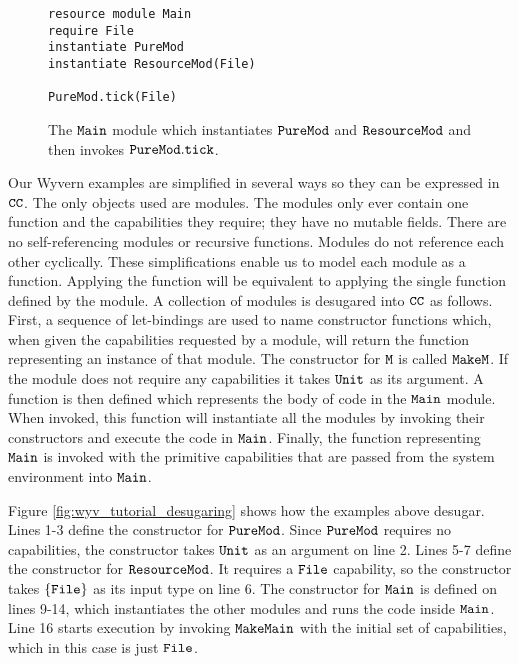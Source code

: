 \begin{figure}[h]

\begin{lstlisting}
resource module Main
require File
instantiate PureMod
instantiate ResourceMod(File)

PureMod.tick(File)
\end{lstlisting}

\caption{The $\mathtt{Main}$ module which instantiates $\mathtt{PureMod}$ and $\mathtt{ResourceMod}$ and then invokes $\mathtt{PureMod.tick}$.}
\label{fig:wyv_module_instantiation}
\end{figure}

Our Wyvern examples are simplified in several ways so they can be expressed in $\mathtt{CC}$. The only objects used are modules. The modules only ever contain one function and the capabilities they require; they have no mutable fields. There are no self-referencing modules or recursive functions. Modules do not reference each other cyclically. These simplifications enable us to model each module as a function. Applying the function will be equivalent to applying the single function defined by the module. A collection of modules is desugared into $\mathtt{CC}$ as follows. First, a sequence of let-bindings are used to name constructor functions which, when given the capabilities requested by a module, will return the function representing an instance of that module. The constructor for $\mathtt{M}$ is called $\mathtt{MakeM}$. If the module does not require any capabilities it takes $\mathtt{Unit}$ as its argument. A function is then defined which represents the body of code in the $\mathtt{Main}$ module. When invoked, this function will instantiate all the modules by invoking their constructors and execute the code in $\mathtt{Main}$. Finally, the function representing $\mathtt{Main}$ is invoked with the primitive capabilities that are passed from the system environment into $\mathtt{Main}$.

Figure \ref{fig:wyv_tutorial_desugaring} shows how the examples above desugar. Lines 1-3 define the constructor for $\mathtt{PureMod}$. Since $\mathtt{PureMod}$ requires no capabilities, the constructor takes $\mathtt{Unit}$ as an argument on line 2. Lines 5-7 define the constructor for $\mathtt{ResourceMod}$. It requires a $\mathtt{File}$ capability, so the constructor takes $\mathtt{\{File\}}$ as its input type on line 6. The constructor for $\mathtt{Main}$ is defined on lines 9-14, which instantiates the other modules and runs the code inside $\mathtt{Main}$. Line 16 starts execution by invoking $\mathtt{MakeMain}$ with the initial set of capabilities, which in this case is just $\mathtt{File}$.

